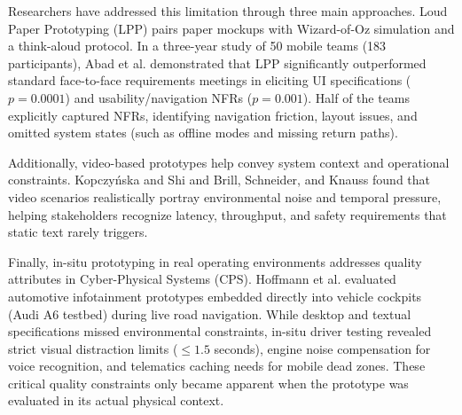 Researchers have addressed this limitation through three main approaches. Loud Paper Prototyping (LPP) \cite{abad2018loud} pairs paper mockups with Wizard-of-Oz simulation and a think-aloud protocol. In a three-year study of 50 mobile teams (183 participants), Abad et al. demonstrated that LPP significantly outperformed standard face-to-face requirements meetings in eliciting UI specifications ($p = 0.0001$) and usability/navigation NFRs ($p = 0.001$). Half of the teams explicitly captured NFRs, identifying navigation friction, layout issues, and omitted system states (such as offline modes and missing return paths).

Additionally, video-based prototypes help convey system context and operational constraints. Kopczy{\'n}ska and Shi \cite{bano2023videos} and Brill, Schneider, and Knauss \cite{brill2010videos} found that video scenarios realistically portray environmental noise and temporal pressure, helping stakeholders recognize latency, throughput, and safety requirements that static text rarely triggers.

Finally, in-situ prototyping in real operating environments addresses quality attributes in Cyber-Physical Systems (CPS). Hoffmann et al. \cite{hoffmann2011automotive} evaluated automotive infotainment prototypes embedded directly into vehicle cockpits (Audi A6 testbed) during live road navigation. While desktop and textual specifications missed environmental constraints, in-situ driver testing revealed strict visual distraction limits ($\le 1.5$ seconds), engine noise compensation for voice recognition, and telematics caching needs for mobile dead zones. These critical quality constraints only became apparent when the prototype was evaluated in its actual physical context.